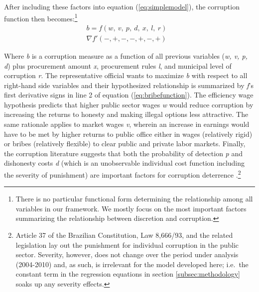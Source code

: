\documentclass[11pt]{article}
\begin{document}
After including these factors into equation (\ref{eq:simplemodel}), the corruption function then becomes:\footnote{There is no particular functional form determining the relationship among all variables in our framework. We mostly focus on the most important factors summarizing the relationship between discretion and corruption.}
\begin{equation} \label{eq:bribefunction}
  \begin{aligned}
    b = f(w,\ v,\ p,\ d,\ x,\ l,\ r)& \\
    \nabla f'(-,+,-,-,+,-,+)&
  \end{aligned}
\end{equation}

Where \emph{b} is a corruption measure as a function of all previous variables (\emph{w, v, p, d}) plus procurement amount \emph{x}, procurement rules \emph{l}, and municipal level of corruption \emph{r}. The representative official wants to maximize \emph{b} with respect to all right-hand side variables and their hypothesized relationship is summarized by \emph{f}'s first derivative signs in line 2 of equation (\ref{eq:bribefunction}). The efficiency wage hypothesis predicts that higher public sector wages \emph{w} would reduce corruption by increasing the returns to honesty and making illegal options less attractive. The same rationale applies to market wages \emph{v}, wherein an increase in earnings would have to be met by higher returns to public office either in wages (relatively rigid) or bribes (relatively flexible) to clear public and private labor markets. Finally, the corruption literature suggests that both the probability of detection \emph{p} and dishonesty costs \emph{d} (which is an unobservable individual cost function including the severity of punishment) are important factors for corruption deterrence \citep{BeckerCrimePunishmentEconomic1968,Rose-AckermanEconomicsCorruption1975}.\footnote{Article 37 of the Brazilian Constitution, Law 8,666/93, and the related legislation lay out the punishment for individual corruption in the public sector. Severity, however, does not change over the period under analysis (2004-2010) and, as such, is irrelevant for the model developed here; i.e.~the constant term in the regression equations in section \ref{subsec:methodology} soaks up any severity effects.}
\end{document}
